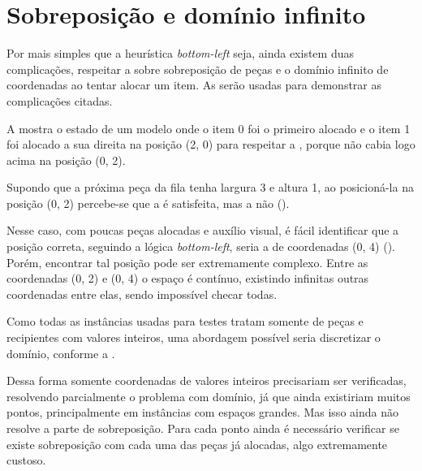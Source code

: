 \section{Sobreposição e domínio infinito}\label{sec:sobreposicao-e-dominio-infinito}

Por mais simples que a heurística \textit{bottom-left} seja, ainda existem duas complicações,
respeitar a  sobre sobreposição de peças e o domínio infinito de coordenadas
ao tentar alocar um item.
As  serão usadas para
demonstrar as complicações citadas.

A  mostra o estado de um modelo onde o item 0 foi o primeiro alocado
e o item 1 foi alocado a sua direita na posição (2, 0) para respeitar a ,
porque não cabia logo acima na posição (0, 2).




Supondo que a próxima peça da fila tenha largura 3 e altura 1, ao posicioná-la na posição (0, 2)
percebe-se que a  é satisfeita, mas a  não ().



Nesse caso, com poucas peças alocadas e auxílio visual, é fácil identificar que a posição correta,
seguindo a lógica \textit{bottom-left}, seria a de coordenadas (0, 4)
().
Porém, encontrar tal posição pode ser extremamente complexo.
Entre as coordenadas (0, 2) e (0, 4) o espaço é contínuo, existindo infinitas outras coordenadas
entre elas, sendo impossível checar todas.



Como todas as instâncias usadas para testes tratam somente de peças e recipientes com valores
inteiros, uma abordagem possível seria discretizar o domínio, conforme a
.



Dessa forma somente coordenadas de valores inteiros precisariam ser verificadas, resolvendo
parcialmente o problema com domínio, já que ainda existiriam muitos pontos, principalmente em
instâncias com espaços grandes.
Mas isso ainda não resolve a parte de sobreposição.
Para cada ponto ainda é necessário verificar se existe sobreposição com cada uma das peças já
alocadas, algo extremamente custoso.

